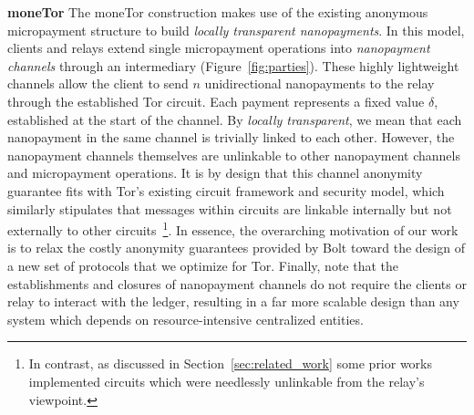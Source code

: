 

\medskip
\noindent\textbf{moneTor} The moneTor construction makes use of the existing anonymous
micropayment structure to build \emph{locally transparent nanopayments}. In this
model, clients and relays extend single micropayment operations into %
\emph{nanopayment channels} through an intermediary (Figure~\ref{fig:parties}).
These highly lightweight channels allow the client to send $n$ %
unidirectional nanopayments to the relay through the established Tor circuit.
Each payment represents a fixed value $\delta$, established at the start of the
channel. By \emph{locally transparent}, we mean that each nanopayment in the
same channel is trivially linked to each other. However, the nanopayment
channels themselves are unlinkable to other nanopayment channels and
micropayment operations. It is by design that this channel anonymity guarantee
fits with Tor's existing circuit framework and security model, which similarly
stipulates that messages within circuits are linkable internally but not
externally to other circuits~\footnote{In contrast, as discussed in
  Section~\ref{sec:related_work} some prior works implemented circuits which
  were needlessly unlinkable from the relay's viewpoint.}. In essence, the
overarching motivation of our work is to relax the costly anonymity guarantees
provided by Bolt toward the design of a new set of protocols that we optimize
for Tor. Finally, note that the establishments and closures of nanopayment
channels do not require the clients or relay to interact with the ledger,
resulting in a far more scalable design than any system which depends on
resource-intensive centralized entities.

